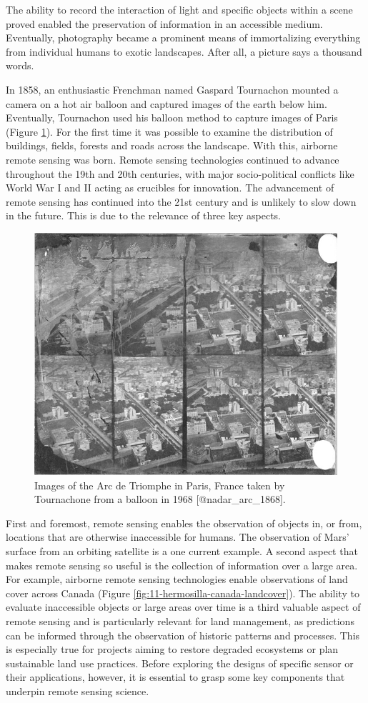 \documentclass[
]{book}
\begin{document}
The ability to record the interaction of light and specific objects within a scene proved enabled the preservation of information in an accessible medium. Eventually, photography became a prominent means of immortalizing everything from individual humans to exotic landscapes. After all, a picture says a thousand words.

In 1858, an enthusiastic Frenchman named Gaspard Tournachon mounted a camera on a hot air balloon and captured images of the earth below him. Eventually, Tournachon used his balloon method to capture images of Paris (Figure \ref{fig:11-nadar}). For the first time it was possible to examine the distribution of buildings, fields, forests and roads across the landscape. With this, airborne remote sensing was born. Remote sensing technologies continued to advance throughout the 19th and 20th centuries, with major socio-political conflicts like World War I and II acting as crucibles for innovation. The advancement of remote sensing has continued into the 21st century and is unlikely to slow down in the future. This is due to the relevance of three key aspects.

\begin{figure}
\includegraphics[width=0.75\linewidth]{images/11-nadar-triomphe-1868} \caption{Images of the Arc de Triomphe in Paris, France taken by Tournachone from a balloon in 1968 [@nadar_arc_1868].}\label{fig:11-nadar}
\end{figure}

First and foremost, remote sensing enables the observation of objects in, or from, locations that are otherwise inaccessible for humans. The observation of Mars' surface from an orbiting satellite is a one current example. A second aspect that makes remote sensing so useful is the collection of information over a large area. For example, airborne remote sensing technologies enable observations of land cover across Canada (Figure \ref{fig:11-hermosilla-canada-landcover}). The ability to evaluate inaccessible objects or large areas over time is a third valuable aspect of remote sensing and is particularly relevant for land management, as predictions can be informed through the observation of historic patterns and processes. This is especially true for projects aiming to restore degraded ecosystems or plan sustainable land use practices. Before exploring the designs of specific sensor or their applications, however, it is essential to grasp some key components that underpin remote sensing science.
\end{document}
